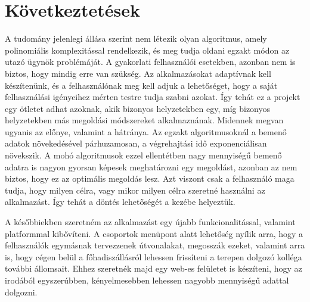 \chapter{Következtetések}\label{ch:ALAP}

A tudomány jelenlegi állása szerint nem létezik olyan algoritmus, amely polinomiális komplexitással rendelkezik, és meg tudja oldani egzakt módon az utazó ügynök problémáját. A gyakorlati felhasználói esetekben, azonban nem is biztos, hogy mindig erre van szükség. Az alkalmazásokat adaptívnak kell készítenünk, és a felhasználónak meg kell adjuk a lehetőséget, hogy a saját felhasználási igényeihez mérten testre tudja szabni azokat. Így tehát ez a projekt egy ötletet adhat azoknak, akik bizonyos helyzetekben egy, míg bizonyos helyzetekben más megoldási módszereket alkalmaznának. Midennek megvan ugyanis az előnye, valamint a hátránya. Az egzakt algoritmusoknál a bemenő adatok növekedésével párhuzamosan, a végrehajtási idő exponenciálisan növekszik. A mohó algoritmusok ezzel ellentétben nagy mennyiségű bemenő adatra is nagyon gyorsan képesek meghatározni egy megoldást, azonban az nem biztos, hogy ez az optimális megoldás lesz. Azt viszont csak a felhasználó maga tudja, hogy milyen célra, vagy mikor milyen célra szeretné használni az alkalmazást. Így tehát a döntés lehetőségét a kezébe helyeztük.

A későbbiekben szeretném az alkalmazást egy újabb funkcionalitással, valamint platformmal kibővíteni. A csoportok menüpont alatt lehetőség nyílik arra, hogy a felhasználók egymásnak tervezzenek útvonalakat, megosszák ezeket, valamint arra is, hogy cégen belül a főhadiszállásról lehessen frissíteni a terepen dolgozó kolléga további állomsait. Ehhez szeretnék majd egy web-es felületet is készíteni, hogy az irodából egyszerúbben, kényelmesebben lehessen nagyobb mennyiségű adattal dolgozni.

